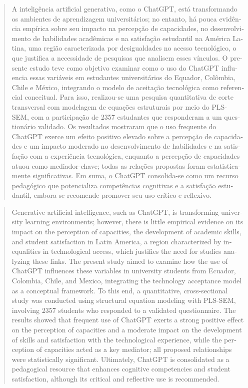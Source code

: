 \documentclass[spanish]{textolivre}
\begin{document}
\begin{polyabstract}
\begin{portuguese}
\begin{abstract}
A inteligência artificial generativa, como o ChatGPT, está transformando os ambientes de aprendizagem universitários; no entanto, há pouca evidência empírica sobre seu impacto na percepção de capacidades, no desenvolvimento de habilidades acadêmicas e na satisfação estudantil na América Latina, uma região caracterizada por desigualdades no acesso tecnológico, o que justifica a necessidade de pesquisas que analisem esses vínculos. O presente estudo teve como objetivo examinar como o uso do ChatGPT influencia essas variáveis em estudantes universitários do Equador, Colômbia, Chile e México, integrando o modelo de aceitação tecnológica como referencial conceitual. Para isso, realizou-se uma pesquisa quantitativa de corte transversal com modelagem de equações estruturais por meio do PLS-SEM, com a participação de 2357 estudantes que responderam a um questionário validado. Os resultados mostraram que o uso frequente do ChatGPT exerce um efeito positivo elevado sobre a percepção de capacidades e um impacto moderado no desenvolvimento de habilidades e na satisfação com a experiência tecnológica, enquanto a percepção de capacidades atuou como mediador-chave; todas as relações propostas foram estatisticamente significativas. Em suma, o ChatGPT consolida-se como um recurso pedagógico que potencializa competências cognitivas e a satisfação estudantil, embora se recomende promover seu uso crítico e reflexivo.

\end{abstract}
\end{portuguese}

\begin{english}
\begin{abstract}
Generative artificial intelligence, such as ChatGPT, is transforming university learning environments; however, there is little empirical evidence on its impact on the perception of capacities, the development of academic skills, and student satisfaction in Latin America, a region characterized by inequalities in technological access, which justifies the need for studies analyzing these links. The present study aimed to examine how the use of ChatGPT influences these variables in university students from Ecuador, Colombia, Chile, and Mexico, integrating the technology acceptance model as a conceptual framework. To this end, a quantitative, cross-sectional study was conducted using structural equation modeling with PLS-SEM, involving 2357 students who responded to a validated questionnaire. The results showed that frequent use of ChatGPT exerts a strong positive effect on the perception of capacities and a moderate impact on the development of skills and satisfaction with the technological experience, while the perception of capacities acted as a key mediator; all proposed relationships were statistically significant. Ultimately, ChatGPT is consolidated as a pedagogical resource that enhances cognitive competencies and student satisfaction, although its critical and reflective use is recommended.


\end{abstract}
\end{english}
\end{polyabstract}
\end{document}
